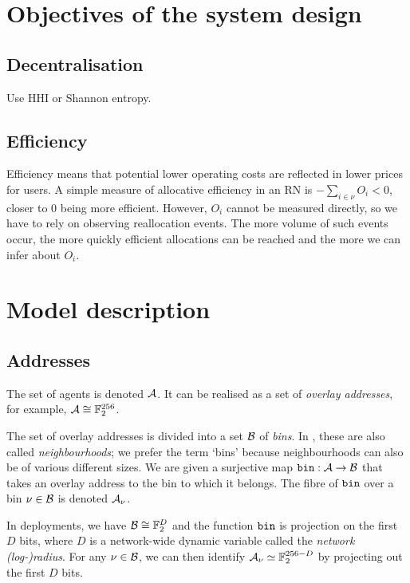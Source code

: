 \section{Objectives of the system design}

\subsection{Decentralisation}

Use HHI or Shannon entropy.

\subsection{Efficiency}

Efficiency means that potential lower operating costs are reflected in lower prices for users.
%
A simple measure of allocative efficiency in an RN is $-\sum_{i\in\nu}O_i<0$, closer to $0$ being more efficient.
%
However, $O_i$ cannot be measured directly, so we have to rely on observing reallocation events.
%
The more volume of such events occur, the more quickly efficient allocations can be reached and the more we can infer about $O_i$.

\section{Model description}

\subsection{Addresses}

The set of agents is denoted $\mathcal{A}$.
%
It can be realised as a set of \emph{overlay addresses}, for example, $\mathcal{A} \cong \mathbb{F}_2^{256}$.

The set of overlay addresses is divided into a set $\mathcal{B}$ of \emph{bins}.
%
In \cite{book-of-swarm}, these are also called \emph{neighbourhoods}; we prefer the term `bins' because neighbourhoods can also be of various different sizes.
%
We are given a surjective map $\mathtt{bin}:\mathcal{A}\rightarrow\mathcal{B}$ that takes an overlay address to the bin to which it belongs.
%
The fibre of $\mathtt{bin}$ over a bin $\nu\in\mathcal{B}$ is denoted $\mathcal{A}_\nu$.

In deployments, we have $\mathcal{B}\cong \mathbb{F}_2^D$ and the function $\mathtt{bin}$ is projection on the first $D$ bits, where $D$ is a network-wide dynamic variable called the \emph{network (log-)radius}.
%
For any $\nu\in\mathcal{B}$, we can then identify $\mathcal{A}_\nu\simeq\mathbb{F}_2^{256-D}$ by projecting out the first $D$ bits.


